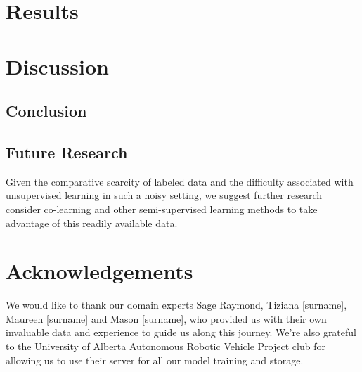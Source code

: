 \documentclass{article}
\begin{document}
\section{Results}

\section{Discussion}

\subsection{Conclusion}

\subsection{Future Research}
Given the comparative scarcity of labeled data and the difficulty associated with unsupervised learning in such a noisy setting, we suggest further research consider co-learning and other semi-supervised learning methods to take advantage of this readily available data.

\section{Acknowledgements}
We would like to thank our domain experts Sage Raymond, Tiziana [surname], Maureen [surname] and Mason [surname], who provided us with their own invaluable data and experience to guide us along this journey. We’re also grateful to the University of Alberta Autonomous Robotic Vehicle Project club for allowing us to use their server for all our model training and storage.
\clearpage


\end{document}
